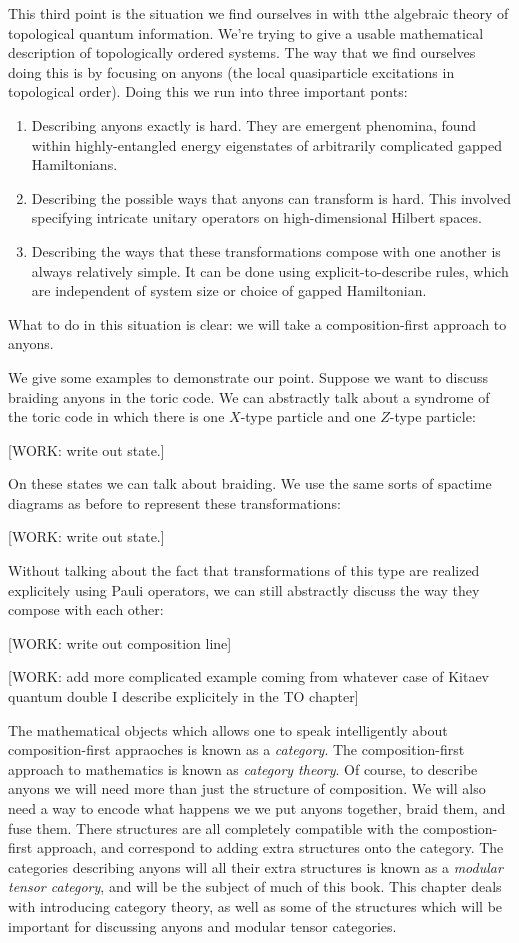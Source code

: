 This third point is the situation we find ourselves in with tthe algebraic theory of topological quantum information. We're trying to give a usable mathematical description of topologically ordered systems. The way that we find ourselves doing this is by focusing on anyons (the local quasiparticle excitations in topological order). Doing this we run into three important ponts:

\begin{enumerate}
\item Describing anyons exactly is hard. They are emergent phenomina, found within highly-entangled energy eigenstates of arbitrarily complicated gapped Hamiltonians.
\item Describing the possible ways that anyons can transform is hard. This involved specifying intricate unitary operators on high-dimensional Hilbert spaces.
\item Describing the ways that these transformations compose with one another is always relatively simple. It can be done using explicit-to-describe rules, which are independent of system size or choice of gapped Hamiltonian.
\end{enumerate}

What to do in this situation is clear: we will take a composition-first approach to anyons.

We give some examples to demonstrate our point. Suppose we want to discuss braiding anyons in the toric code. We can abstractly talk about a syndrome of the toric code in which there is one $X$-type particle and one $Z$-type particle:

[WORK: write out state.]

On these states we can talk about braiding. We use the same sorts of spactime diagrams as before to represent these transformations:

[WORK: write out state.]

Without talking about the fact that transformations of this type are realized explicitely using Pauli operators, we can still abstractly discuss the way they compose with each other:

[WORK: write out composition line]

[WORK: add more complicated example coming from whatever case of Kitaev quantum double I describe explicitely in the TO chapter]

The mathematical objects which allows one to speak intelligently about composition-first appraoches is known as a \textit{category}. The composition-first approach to mathematics is known as \textit{category theory}. Of course, to describe anyons we will need more than just the structure of composition. We will also need a way to encode what happens we we put anyons together, braid them, and fuse them. There structures are all completely compatible with the compostion-first approach, and correspond to adding extra structures onto the category. The categories describing anyons will all their extra structures is known as a \textit{modular tensor category}, and will be the subject of much of this book. This chapter deals with introducing category theory, as well as some of the structures which will be important for discussing anyons and modular tensor categories.

